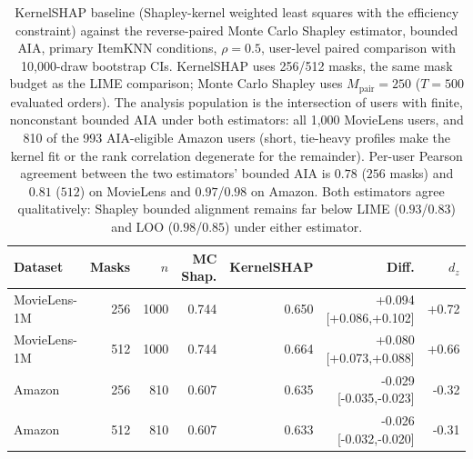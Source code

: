 \begin{table}[!htbp]\centering\scriptsize\setlength{\tabcolsep}{3pt}
\caption{KernelSHAP baseline (Shapley-kernel weighted least squares with the
efficiency constraint) against the reverse-paired Monte Carlo Shapley
estimator, bounded AIA, primary ItemKNN conditions, $\rho=0.5$, user-level
paired comparison with 10,000-draw bootstrap CIs. KernelSHAP uses 256/512
masks, the same mask budget as the LIME comparison; Monte Carlo Shapley uses
$M_{\mathrm{pair}}=250$ ($T=500$ evaluated orders). The analysis population
is the intersection of users with finite, nonconstant bounded AIA under both
estimators: all 1,000 MovieLens users, and 810 of the 993 AIA-eligible
Amazon users (short, tie-heavy profiles make the kernel fit or the rank
correlation degenerate for the remainder). Per-user Pearson agreement
between the two estimators' bounded AIA is $0.78$ ($256$ masks) and $0.81$
($512$) on MovieLens and $0.97$/$0.98$ on Amazon. Both estimators agree
qualitatively: Shapley bounded alignment remains far below LIME ($0.93$/$0.83$)
and LOO ($0.98$/$0.85$) under either estimator.}
\label{tab:review7-kernelschap}
\begin{tabular}{@{}lrrrrrr@{}}
\toprule
Dataset & Masks & $n$ & MC Shap. & KernelSHAP & Diff. & $d_z$ \\
\midrule
MovieLens-1M & 256 & 1000 & 0.744 & 0.650 & +0.094 [+0.086,+0.102] & +0.72 \\
MovieLens-1M & 512 & 1000 & 0.744 & 0.664 & +0.080 [+0.073,+0.088] & +0.66 \\
Amazon & 256 & 810 & 0.607 & 0.635 & -0.029 [-0.035,-0.023] & -0.32 \\
Amazon & 512 & 810 & 0.607 & 0.633 & -0.026 [-0.032,-0.020] & -0.31 \\
\bottomrule
\end{tabular}
\end{table}